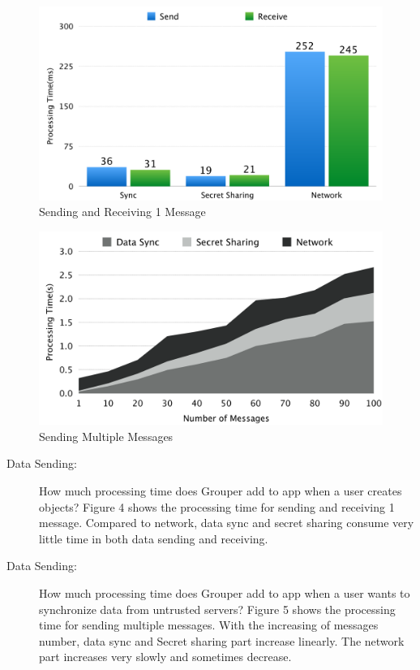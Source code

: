 \documentclass[twocolumn,10pt]{article}
\begin{document}
\begin{figure}[!htb]
	\centering
	\includegraphics[scale=0.12]{processing1}
	\caption{Sending and Receiving 1 Message}
\end{figure}

\begin{figure}[!htb]
	\centering
	\includegraphics[scale=0.12]{processing2}
	\caption{Sending Multiple Messages}
\end{figure}

\begin{description}
	\item[Data Sending:] How much processing time does Grouper add to app when a user creates objects?
	Figure 4 shows the processing time for sending and receiving 1 message. Compared to network, data sync and secret sharing consume very little time in both data sending and receiving.
	\item[Data Sending:] How much processing time does Grouper add to app when a user wants to synchronize data from untrusted servers?
	Figure 5 shows the processing time for sending multiple messages. With the increasing of messages number, data sync and Secret sharing part increase linearly. The network part increases very slowly and sometimes decrease.
\end{description}
\end{document}
